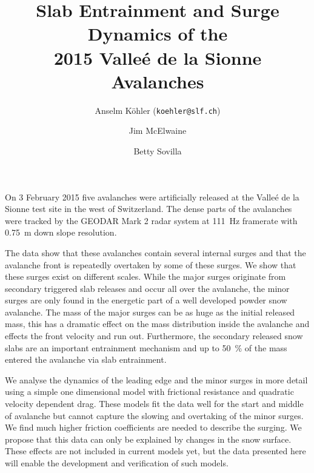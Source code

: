 \documentclass[unknownkeysallowed,usepdftitle=false]{beamer}
\title{Slab Entrainment and Surge Dynamics of the \\ 2015 Valle\'e de la
Sionne Avalanches}
\author{Anselm K\"ohler\inst{1} (\texttt{koehler@slf.ch}) \and Jim
McElwaine\inst{2} \and Betty
Sovilla\inst{1}}
\institute{\inst{1}Institut f\"ur Schnee- und Lawinenforschung SLF, Davos Dorf,
Switzerland
\quad \inst{2}Department of Earth Science, Durham University, UK}
\newcommand{\secvariable}{nothing}
\newcommand{\mysection}[1]{\renewcommand{\secvariable}{#1}
}
\begin{document}
\mysection{abstract}
\begin{frame}\label{\secvariable}
\justifying
On 3 February 2015 five avalanches were artificially released at the Valle\'e de
la Sionne test site in the west of Switzerland. The dense parts of the
avalanches were tracked by the GEODAR Mark 2 radar system at \SI{111}{\hertz}
framerate with \SI{0.75}{\metre} down slope resolution.

\vspace{0.2cm}
The data show that these avalanches contain several internal surges and
that the avalanche front is repeatedly overtaken by some of these surges. We
show that these surges exist on different scales. While the major surges
originate
from secondary triggered slab releases and occur all over the avalanche, the
minor surges are only found in the energetic part of a well developed powder
snow avalanche. The mass of the major surges can be as huge as the initial
released mass, this has a dramatic effect on the mass distribution inside the
avalanche and effects the front velocity and run out. Furthermore, the secondary
released snow slabs are an important entrainment mechanism and up to
\SI{50}{\percent} of the mass entered the avalanche via slab entrainment.

\vspace{0.2cm}
We analyse the dynamics of the leading edge and the minor surges in more detail
using a simple one dimensional model with frictional resistance and quadratic
velocity dependent drag. These models fit the data well for the start and middle
of avalanche but cannot capture the slowing and overtaking of the minor surges.
We find much higher friction coefficients are needed to describe the surging. We propose
that this data can only be explained by changes in the snow surface. These
effects are not included in current models yet, but the data presented here will
enable the development and verification of such models.

\end{frame}
\end{document}
